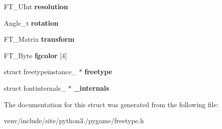\begin{DoxyCompactItemize}
F\+T\+\_\+\+U\+Int {\bfseries resolution}
\item 
\mbox{\label{struct_pg_font_object_a9757ca1b813b4b5df5ce892972775b5b}} 
Angle\+\_\+t {\bfseries rotation}
\item 
\mbox{\label{struct_pg_font_object_a665d9c7c1a42447dae82d3bf5fa1eb12}} 
F\+T\+\_\+\+Matrix {\bfseries transform}
\item 
\mbox{\label{struct_pg_font_object_afabbe49d8501123039c885d832f192bb}} 
F\+T\+\_\+\+Byte {\bfseries fgcolor} \mbox{[}4\mbox{]}
\item 
\mbox{\label{struct_pg_font_object_a4d0c1c526ea3abc917f174f5471b9d82}} 
struct freetypeinstance\+\_\+ $\ast$ {\bfseries freetype}
\item 
\mbox{\label{struct_pg_font_object_ad373fded7d3a98bb82e72c8da33f9f5a}} 
struct fontinternals\+\_\+ $\ast$ {\bfseries \+\_\+internals}
\end{DoxyCompactItemize}


The documentation for this struct was generated from the following file\+:\begin{DoxyCompactItemize}
\item 
venv/include/site/python3./pygame/freetype.\+h\end{DoxyCompactItemize}
